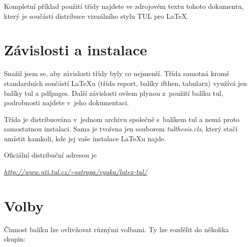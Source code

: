 \documentclass[FM,DP,EN]{tulthesis}
\newcommand{\argument}[1]{{\ttfamily\color{\tulcolor}#1}}
\newenvironment{myquote}{\begin{list}{}{\setlength\leftmargin\parindent}\item[]}{\end{list}}
\newenvironment{listing}{\begin{myquote}\color{\tulcolor}}{\end{myquote}}
\begin{document}
Kompletní příklad použití třídy najdete ve zdrojovém textu tohoto dokumentu,
který je součástí distribuce vizuálního stylu TUL pro \LaTeX.


\chapter{Závislosti a instalace}

Snažil jsem se, aby závislosti třídy byly co nejmenší. Třída samotná kromě
standardních součástí \LaTeX u (třída \argument{report}, balíky
\argument{ifthen}, \argument{tabularx}) využívá jen balíky \argument{tul} a
\argument{pdfpages}. Další závislosti ovšem plynou z~použití balíku
\argument{tul}, podrobnosti najdete v~jeho dokumentaci.

Třída je distribuována v~jednom archivu společně s~balíkem \argument{tul} a
nemá proto samostatnou instalaci. Sama je tvořena jen souborem
\emph{tulthesis.cls}, který stačí umístit kamkoli, kde jej vaše instalace
\LaTeX u najde. 

Oficiální distribuční adresou je

\begin{listing}
\href{http://www.nti.tul.cz/~satrapa/vyuka/latex-tul/}{\emph{http://www.nti.tul.cz/\textasciitilde satrapa/vyuka/latex-tul/}}
\end{listing}


\chapter{Volby}

Činnost balíku lze ovlivňovat různými volbami. Ty lze rozdělit do několika
skupin:
\end{document}
